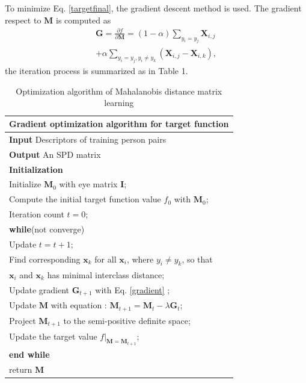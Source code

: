 \documentclass[10pt,twocolumn,letterpaper]{article}
\begin{document}
 To minimize Eq. \eqref{targetfinal}, the gradient descent method is used. The gradient respect to $\bm{M}$ is computed as
 \begin{equation}\label{gradient}
 \begin{aligned}
 \bm{G} =\frac{\partial f}{\partial \bm{M}} = (1-\alpha) \sum_{y_i = y_j} \bm{X}_{i,j} \\
 + \alpha \sum_{y_i = y_j, y_i \ne y_k}(\bm{X}_{i,j} - \bm{X}_{i,k}),
 \end{aligned}
 \end{equation}
the iteration process is summarized as in Table 1.
 \begin{table}[H]
 \centering
 \caption{Optimization algorithm of Mahalanobis distance matrix learning}
 \label{Gradientdemo}
 \begin{tabular}{l}
 \hline 
 \multicolumn{1}{l}{\textbf{Gradient optimization algorithm for target function}} \\
 \hline
 \textbf{Input} Descriptors of training person pairs \\
 \textbf{Output} An SPD matrix\\
 \textbf{Initialization} \\
 Initialize $\bm{M}_0$ with eye matrix $\bm{I}$; \\
 Compute the initial target function value $f_0$ with $\bm{M}_0$;\\
 Iteration count  $t = 0$;\\

 \textbf{while}(not converge)\\
 \hspace{0.5cm} Update $t =  t + 1$;\\
 \hspace{0.5cm}  Find corresponding $\bm{x}_k$ for all $\bm{x}_i$, where $y_i \ne y_k$, so that \\ \hspace{0.5cm} $\bm{x}_i$ and $\bm{x}_k$ has minimal interclass distance;\\
 \hspace{0.5cm} Update gradient $\bm{G}_{t+1}$ with Eq. \eqref{gradient} ;\\
 \hspace{0.5cm}  Update $\bm{M}$ with equation : $\bm{M}_{t+1} = \bm{M}_{t} - \lambda\bm{G}_t$;\\
 \hspace{0.5cm}  Project $\bm{M}_{t+1}$ to the semi-positive definite space; \\ 
 \hspace{0.5cm}  Update the target value $f|_{\bm{M} = \bm{M}_{t+1}}$;\\
 \textbf{end while}  \\
 return $\bm{M}$\\
 \hline
 \end{tabular} 
 \end{table}
 
\end{document}
